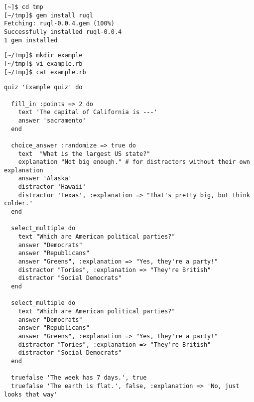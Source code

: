 
\begin{verbatim}
[~]$ cd tmp
[~/tmp]$ gem install ruql
Fetching: ruql-0.0.4.gem (100%)
Successfully installed ruql-0.0.4
1 gem installed
\end{verbatim}

\begin{verbatim}
[~/tmp]$ mkdir example
[~/tmp]$ vi example.rb
[~/tmp]$ cat example.rb 
\end{verbatim}

\begin{lstlisting}
quiz 'Example quiz' do
  
  fill_in :points => 2 do
    text 'The capital of California is ---'
    answer 'sacramento'
  end
  
  choice_answer :randomize => true do
    text  "What is the largest US state?"
    explanation "Not big enough." # for distractors without their own explanation
    answer 'Alaska'
    distractor 'Hawaii'
    distractor 'Texas', :explanation => "That's pretty big, but think colder."
  end
  
  select_multiple do
    text "Which are American political parties?"
    answer "Democrats"
    answer "Republicans"
    answer "Greens", :explanation => "Yes, they're a party!"
    distractor "Tories", :explanation => "They're British"
    distractor "Social Democrats"
  end
  
  select_multiple do
    text "Which are American political parties?"
    answer "Democrats"
    answer "Republicans"
    answer "Greens", :explanation => "Yes, they're a party!"
    distractor "Tories", :explanation => "They're British"
    distractor "Social Democrats"
  end
  
  truefalse 'The week has 7 days.', true
  truefalse 'The earth is flat.', false, :explanation => 'No, just looks that way'
\end{lstlisting}

